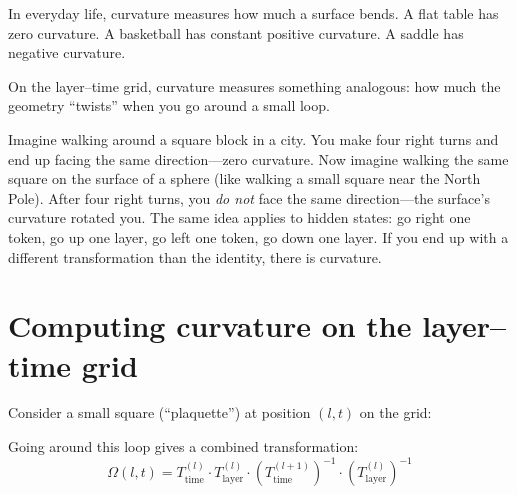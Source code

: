 \documentclass[11pt, twoside, openright]{memoir}
\begin{document}
In everyday life, curvature measures how much a surface bends. A flat table
has zero curvature. A basketball has constant positive curvature. A saddle
has negative curvature.

On the layer--time grid, curvature measures something analogous: how much
the geometry ``twists'' when you go around a small loop.

\begin{analogy}
Imagine walking around a square block in a city. You make four right turns
and end up facing the same direction---zero curvature. Now imagine walking
the same square on the surface of a sphere (like walking a small square near
the North Pole). After four right turns, you \emph{do not} face the same
direction---the surface's curvature rotated you. The same idea applies to
hidden states: go right one token, go up one layer, go left one token,
go down one layer. If you end up with a different transformation than the
identity, there is curvature.
\end{analogy}

\section{Computing curvature on the layer--time grid}

Consider a small square (``plaquette'') at position $(l, t)$ on the grid:

\begin{center}
\end{center}

Going around this loop gives a combined transformation:
\[
  \Omega(l, t) = T^{(l)}_{\text{time}} \cdot T^{(l)}_{\text{layer}}
  \cdot \left(T^{(l+1)}_{\text{time}}\right)^{-1}
  \cdot \left(T^{(l)}_{\text{layer}}\right)^{-1}
\]
\end{document}
